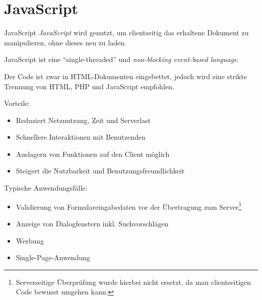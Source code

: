\section{JavaScript}

\begin{defi}{JavaScript}
    \emph{JavaScript} wird genutzt, um clientseitig das erhaltene Dokument zu manipulieren, ohne dieses neu zu laden.

    JavaScript ist eine \enquote{single-threaded} und \emph{non-blocking event-based language}.

    Der Code ist zwar in HTML-Dokumenten eingebettet, jedoch wird eine strikte Trennung von HTML, PHP und JavaScript empfohlen.

    Vorteile:
    \begin{itemize}
        \item Reduziert Netznutzung, Zeit und Serverlast
        \item Schnellere Interaktionen mit Benutzenden
        \item Auslagern von Funktionen auf den Client möglich
        \item Steigert die Nutzbarkeit und Benutzungsfreundlichkeit
    \end{itemize}

    Typische Anwendungsfälle:
    \begin{itemize}
        \item Validierung von Formulareingabedaten vor der Übertragung zum Server\footnote{Serverseitige Überprüfung wurde hierbei nicht ersetzt, da man clientseitigen Code bewusst umgehen kann.}
        \item Anzeige von Dialogfenstern inkl. Suchvorschlägen
        \item Werbung
        \item Single-Page-Anwendung
    \end{itemize}
\end{defi}

